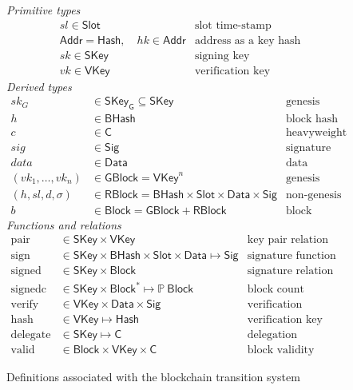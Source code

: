 \documentclass[11pt,a4paper]{article}
\newcommand{\powerset}[1]{\mathbb{P}~#1}
\newcommand{\type}[1]{\mathsf{#1}}
\newcommand{\seqof}[1]{#1^{*}}
\newcommand{\Hash}{\type{Hash}}    %
\newcommand{\BHash}{\type{BHash}}  %
\newcommand{\Addr}{\type{Addr}}
\newcommand{\Slot}{\type{Slot}}
\newcommand{\GBlock}{\type{GBlock}}
\newcommand{\RBlock}{\type{RBlock}}
\newcommand{\Block}{\type{Block}}
\newcommand{\HCert}{\type{C}}
\newcommand{\SKey}{\type{SKey}}
\newcommand{\SKeyGen}{\type{SKey_G}}
\newcommand{\VKey}{\type{VKey}}
\newcommand{\Sig}{\type{Sig}}
\newcommand{\Data}{\type{Data}}
\newcommand{\hashname}{hash}
\newcommand{\signname}{sign}
\newcommand{\signedname}{signed}
\newcommand{\signedseqname}{signedc}
\newcommand{\verifyname}{verify}
\newcommand{\delegatename}{delegate}
\newcommand{\validname}{valid}
\newcommand{\keypairname}{pair}
\begin{document}
\begin{figure}[h]
  \emph{Primitive types}
  \begin{align*}
    & sl \in \Slot & \text{slot time-stamp}\\
    & \Addr = \Hash,\quad hk \in \Addr & \text{address as a key hash}\\
    & sk \in \SKey & \text{signing key}\\
    & vk \in \VKey & \text{verification key}
  \end{align*}
  \emph{Derived types}
  \begin{align*}
    sk_G & \in \SKeyGen \subseteq \SKey & \text{genesis block's signing key}\\
    h & \in \BHash & \text{block hash}\\
    c & \in \HCert & \text{heavyweight delegation certificate}\\
    sig & \in \Sig  & \text{signature}\\
    data & \in \Data  & \text{data}\\
    (vk_1, \dotsc, vk_n) & \in \GBlock = \VKey^n & \text{genesis block} \\
    (h, sl, d, \sigma) & \in \RBlock = \BHash \times \Slot \times \Data \times \Sig
      & \text{non-genesis block} \\
    b & \in \Block = \GBlock + \RBlock & \text{block}
  \end{align*}
  \emph{Functions and relations}
  \begin{align*}
    \text{\keypairname} & \in \SKey \times \VKey & \text{key pair relation}\\
    \text{\signname} & \in \SKey \times \BHash \times \Slot \times \Data \mapsto \Sig
      & \text{signature function}\\
    \text{\signedname} & \in \SKey \times \Block & \text{signature relation}\\
    \text{\signedseqname} & \in \SKey \times \seqof{\Block} \mapsto \powerset{\Block}
      & \text{block count function}\\
    \text{\verifyname} & \in \VKey \times \Data \times \Sig
      & \text{verification relation}\\
    \text{\hashname} & \in \VKey \mapsto \Hash
      & \text{verification key hash function}\\
    \text{\delegatename} & \in \SKey \mapsto \HCert
      & \text{delegation function}\\
    \text{\validname} & \in \Block \times \VKey \times \HCert
      & \text{block validity relation}
  \end{align*}
  \caption{Definitions associated with the blockchain transition system}
  \label{fig:state-trans-abstract}
\end{figure}
\end{document}
